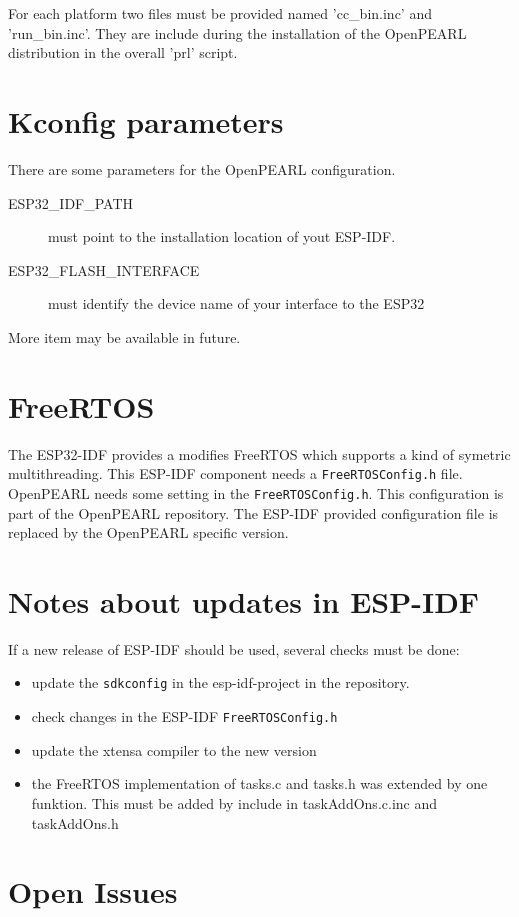 For each platform two files must be provided named 'cc\_bin.inc'
and 'run\_bin.inc'. They are include during the installation of the OpenPEARL
distribution in the overall 'prl' script.

\section{Kconfig parameters}
There are some parameters for the OpenPEARL configuration.
\begin{description}
\item[ESP32\_IDF\_PATH] must point to the installation location of yout ESP-IDF.
\item[ESP32\_FLASH\_INTERFACE] must identify the device name
   of your interface to the ESP32
\end{description}
More item may be available in future.

\section{FreeRTOS}
The ESP32-IDF provides a modifies FreeRTOS which supports a kind of 
symetric multithreading.
This ESP-IDF component needs a \verb|FreeRTOSConfig.h| file.
OpenPEARL needs some setting in the \verb|FreeRTOSConfig.h|. 
This configuration is part of the OpenPEARL repository. The ESP-IDF provided
configuration file is replaced by the OpenPEARL specific version.

\section{Notes about updates in ESP-IDF}
If a new release of ESP-IDF should be used, several checks must be done:
\begin{itemize}
\item update the \verb|sdkconfig| in the esp-idf-project in the repository.
\item check changes in the ESP-IDF \verb|FreeRTOSConfig.h|
\item update the xtensa compiler to the new version
\item the FreeRTOS implementation of tasks.c and tasks.h was extended by one
  funktion. This must be added by include in taskAddOns.c.inc and taskAddOns.h
\end{itemize}

\section{Open Issues}
